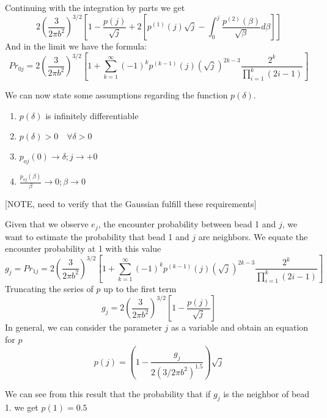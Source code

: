 \documentclass[12pt]{article}
\begin{document}
Continuing with the integration by parts we get 
\begin{equation*}
2\left(\frac{3}{2\pi b^2}\right)^{3/2}\left[1 -\frac{p(j)}{\sqrt{j}}+2[p^{(1)}(j)\sqrt{j}-\int_0^{j}\frac{p^{(2)}(\beta)}{\sqrt{\beta}}d\beta]\right]
\end{equation*}
And in the limit we have the formula:
\begin{equation*}
Pr_{0j}=2\left(\frac{3}{2\pi b^2}\right)^{3/2}\left[ 1+\sum_{k=1}^\infty (-1)^k p^{(k-1)}(j)\left(\sqrt{j}\right)^{2k-3} \frac{2^k}{\prod_{i=1}^k (2i-1)}\right]
\end{equation*} 

We can now state some assumptions regarding the function $p(\delta)$.
\begin{enumerate}
	\item $p(\delta)$ is infinitely differentiable
	\item $p(\delta)>0 \quad  \forall \delta >0$
	\item $p_{oj}(0)\rightarrow \delta;  j\rightarrow +0$
	\item $\frac{p_{oj}(\beta)}{\beta}\rightarrow 0; \beta \rightarrow 0$
\end{enumerate}


[NOTE, need to verify that the Gaussian fulfill these requirements]

Given that we observe $e_j$, the encounter probability between bead 1 and $j$, we want to estimate the probability that bead 1 and $j$ are neighbors.
We equate the encounter probability at 1 with this value 
\begin{equation*}
g_j = Pr_{1j}=2\left(\frac{3}{2\pi b^2}\right)^{3/2}\left[ 1+\sum_{k=1}^\infty (-1)^k p^{(k-1)}(j)\left(\sqrt{j}\right)^{2k-3} \frac{2^k}{\prod_{i=1}^k (2i-1)}\right] 
\end{equation*}
Truncating the series of $p$ up to the first term 
\begin{equation*}
g_j = 2\left(\frac{3}{2\pi b^2}\right)^{3/2}\left[1 -\frac{p(j)}{\sqrt{j}}\right]
\end{equation*}
In general, we can consider the parameter $j$ as a variable and obtain an equation for $p$ 
\begin{equation*}
p(j)= \left(1-\frac{g_j}{2(3/2\pi b^2)^{1.5}}\right)\sqrt{j}
\end{equation*}

We can see from this result that the probability that if $g_j$ is the neighbor of bead 1. we get $p(1)=0.5$



\end{document}
